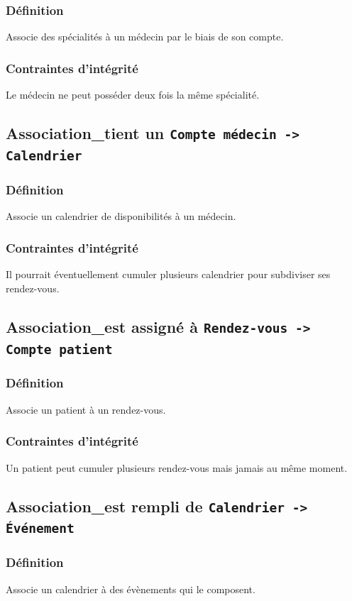 \subsubsection{Définition}
Associe des spécialités à un médecin par le biais de son compte.
\subsubsection{Contraintes d'intégrité}
Le médecin ne peut posséder deux fois la même spécialité.

\subsection{Association\_tient un \texttt{Compte médecin -> Calendrier}}
\subsubsection{Définition}
Associe un calendrier de disponibilités à un médecin.
\subsubsection{Contraintes d'intégrité}
Il pourrait éventuellement cumuler plusieurs calendrier pour subdiviser ses
rendez-vous.

\subsection{Association\_est assigné à \texttt{Rendez-vous -> Compte patient}}
\subsubsection{Définition}
Associe un patient à un rendez-vous.
\subsubsection{Contraintes d'intégrité}
Un patient peut cumuler plusieurs rendez-vous mais jamais au même moment.

\subsection{Association\_est rempli de \texttt{Calendrier -> Événement}}
\subsubsection{Définition}
Associe un calendrier à des évènements qui le composent.
